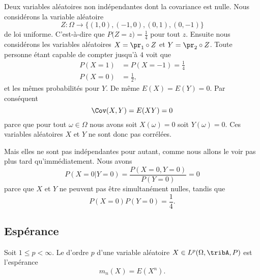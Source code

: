 \begin{example} \label{ExWLzkuWd}
    Deux variables aléatoires non indépendantes dont la covariance est nulle. Nous considérons la variable aléatoire
    \begin{equation}
        Z\colon \Omega\to \{ (1,0),(-1,0),(0,1),(0,-1) \}
    \end{equation}
    de loi uniforme. C'est-à-dire que \(  P\big( Z=z \big)=\frac{1}{ 4 }  \) pour tout \( z\). Ensuite nous considérons les variables aléatoires \( X=\pr_1\circ Z\) et \( Y=\pr_2\circ Z\). Toute personne étant capable de compter jusqu'à \( 4\) voit que
    \begin{subequations}
        \begin{align}
            P(X=1)&=P(X=-1)=\frac{1}{ 4 }\\
            P(X=0)&=\frac{ 1 }{2},
        \end{align}
    \end{subequations}
    et les mêmes probabilités pour \( Y\). De même \( E(X)=E(Y)=0\). Par conséquent
    \begin{equation}
        \Cov(X,Y)=E(XY)=0
    \end{equation}
    parce que pour tout \( \omega\in \Omega\) nous avons soit \( X(\omega)=0\) soit \( Y(\omega)=0\). Ces variables aléatoires \( X\) et \( Y\) ne sont donc pas corrélées.

    Mais elles ne sont pas indépendantes pour autant, comme nous allons le voir pas plus tard qu'immédiatement. Nous avons
    \begin{equation}
        P(X=0|Y=0)=\frac{ P(X=0,Y=0) }{ P(Y=0) }=0
    \end{equation}
    parce que \( X\) et \( Y\) ne peuvent pas être simultanément nulles, tandis que
    \begin{equation}
        P(X=0)P(Y=0)=\frac{1}{ 4 }.
    \end{equation}
\end{example}

\subsection{Espérance}

\begin{definition}
    Soit \( 1\leq p<\infty\). Le  d'ordre \( p\) d'une variable aléatoire \( X\in L^p(\Omega,\tribA,P)\) est l'espérance
    \begin{equation}
        m_n(X)=E(X^n).
    \end{equation}
\end{definition}

